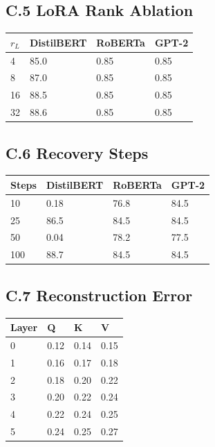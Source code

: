 \subsection{C.5 LoRA Rank Ablation}

\begin{table}[H]
\centering
\small
\begin{tabular}{llll}
\toprule
\textbf{$r_L$} & \textbf{DistilBERT} & \textbf{RoBERTa} & \textbf{GPT-2} \\
\midrule
4 & 85.0 & 0.85 & 0.85 \\
8 & 87.0 & 0.85 & 0.85 \\
16 & 88.5 & 0.85 & 0.85 \\
32 & 88.6 & 0.85 & 0.85 \\
\bottomrule
\end{tabular}
\end{table}

\subsection{C.6 Recovery Steps}

\begin{table}[H]
\centering
\small
\begin{tabular}{llll}
\toprule
\textbf{Steps} & \textbf{DistilBERT} & \textbf{RoBERTa} & \textbf{GPT-2} \\
\midrule
10 & 0.18 & 76.8 & 84.5 \\
25 & 86.5 & 84.5 & 84.5 \\
50 & 0.04 & 78.2 & 77.5 \\
100 & 88.7 & 84.5 & 84.5 \\
\bottomrule
\end{tabular}
\end{table}

\subsection{C.7 Reconstruction Error}

\begin{table}[H]
\centering
\small
\begin{tabular}{llll}
\toprule
\textbf{Layer} & \textbf{Q} & \textbf{K} & \textbf{V} \\
\midrule
0 & 0.12 & 0.14 & 0.15 \\
1 & 0.16 & 0.17 & 0.18 \\
2 & 0.18 & 0.20 & 0.22 \\
3 & 0.20 & 0.22 & 0.24 \\
4 & 0.22 & 0.24 & 0.25 \\
5 & 0.24 & 0.25 & 0.27 \\
\bottomrule
\end{tabular}
\end{table}

